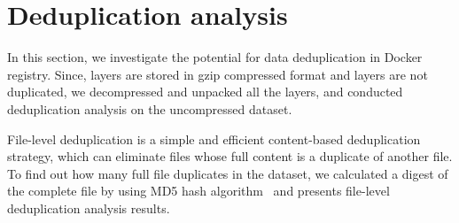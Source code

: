 \section{Deduplication analysis}
\label{sec:redundant_files}



In this section, we
investigate the potential for data deduplication in Docker registry. 
Since, layers are stored in gzip compressed format and layers are not
duplicated, we decompressed and unpacked all the layers, and conducted
deduplication analysis on the uncompressed dataset.
 
File-level deduplication is a simple and efficient content-based deduplication
strategy, which can eliminate files whose full content is a duplicate of
another file. To find out how many full file duplicates in the dataset, we
calculated a digest of the complete file by using MD5 hash algorithm~\cite{xxx} and
presents file-level deduplication analysis results.
%



